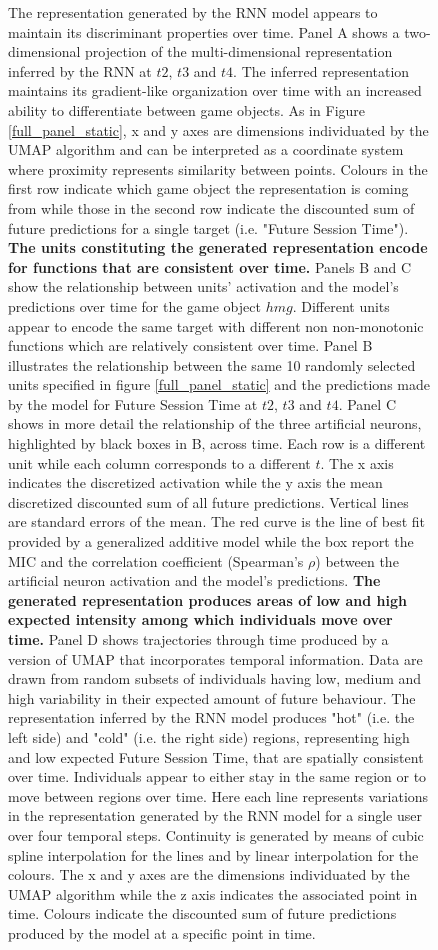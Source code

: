 \begin{figure}[!htb]
\caption[\textbf{Lower dimensional representation of the evolution of the latent states generated by the RNN architecture}]{The representation generated by the RNN model appears to maintain its discriminant properties over time. Panel A shows a two-dimensional projection of the multi-dimensional representation inferred by the RNN at $t2$, $t3$ and $t4$. The inferred representation maintains its gradient-like organization over time with an increased ability to differentiate between game objects. As in Figure \ref{full_panel_static}, x and y axes are dimensions individuated by the UMAP algorithm and can be interpreted as a coordinate system where proximity represents similarity between points. Colours in the first row indicate which game object the representation is coming from while those in the second row indicate the discounted sum of future predictions for a single target (i.e. "Future Session Time"). \textbf{The units constituting the generated representation encode for functions that are consistent over time.} Panels B and C show the relationship between units' activation and the model's predictions over time for the game object $hmg$. Different units appear to encode the same target with different non non-monotonic functions which are relatively consistent over time. Panel B illustrates the relationship between the same 10 randomly selected units specified in figure \ref{full_panel_static} and the predictions made by the model for Future Session Time at $t2$, $t3$ and $t4$. Panel C shows in more detail the relationship of the three artificial neurons, highlighted by black boxes in B, across time. Each row is a different unit while each column corresponds to a different $t$. The x axis indicates the discretized activation while the y axis the mean discretized discounted sum of all future predictions. Vertical lines are standard errors of the mean. The red curve is the line of best fit provided by a generalized additive model \cite{serven2018} while the box report the MIC and the correlation coefficient (Spearman's $\rho$) between the artificial neuron activation and the model's predictions. \textbf{The generated representation produces areas of low and high expected intensity among which individuals move over time.} Panel D shows trajectories through time produced by a version of UMAP that incorporates temporal information. Data are drawn from random subsets of individuals having low, medium and high variability in their expected amount of future behaviour. The representation inferred by the RNN model produces "hot" (i.e. the left side) and "cold" (i.e. the right side) regions, representing high and low expected Future Session Time, that are spatially consistent over time. Individuals appear to either stay in the same region or to move between regions over time. Here each line represents variations in the representation generated by the RNN model for a single user over four temporal steps. Continuity is generated by means of cubic spline interpolation for the lines and by linear interpolation for the colours. The x and y axes are the dimensions individuated by the UMAP algorithm while the z axis indicates the associated point in time. Colours indicate the discounted sum of future predictions produced by the model at a specific point in time.}

\end{figure}
